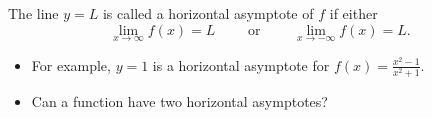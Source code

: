 \begin{frame}
\begin{definition}
The line $y = L$ is called a horizontal asymptote of $f$ if either
\[
\lim_{x\to \infty}f(x) = L \qquad \textrm{ or } \qquad \lim_{x\to - \infty} f(x) = L.
\]
\end{definition}
\begin{itemize}
\item<2->  For example, $y = 1$ is a horizontal asymptote for $f(x) = \frac{x^2-1}{x^2+1}$.%
\item<3->  Can a function have two horizontal asymptotes?  \alert<handout:0| 4>{}%
\end{itemize}
%
\end{frame}
